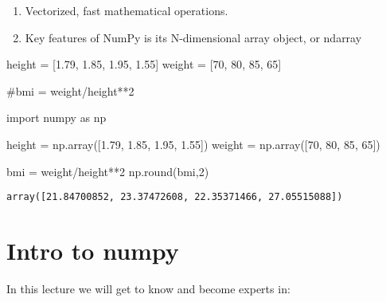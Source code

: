\documentclass[
  letterpaper,
  DIV=11,
  numbers=noendperiod]{scrreprt}
\newenvironment{Shaded}{\begin{snugshade}}{\end{snugshade}}
\newcommand{\BuiltInTok}[1]{\textcolor[rgb]{0.00,0.23,0.31}{#1}}
\newcommand{\CommentTok}[1]{\textcolor[rgb]{0.37,0.37,0.37}{#1}}
\newcommand{\DecValTok}[1]{\textcolor[rgb]{0.68,0.00,0.00}{#1}}
\newcommand{\FloatTok}[1]{\textcolor[rgb]{0.68,0.00,0.00}{#1}}
\newcommand{\ImportTok}[1]{\textcolor[rgb]{0.00,0.46,0.62}{#1}}
\newcommand{\NormalTok}[1]{\textcolor[rgb]{0.00,0.23,0.31}{#1}}
\newcommand{\OperatorTok}[1]{\textcolor[rgb]{0.37,0.37,0.37}{#1}}
\providecommand{\tightlist}{%
  \setlength{\itemsep}{0pt}\setlength{\parskip}{0pt}}\usepackage{longtable,booktabs,array}
\begin{document}
\begin{enumerate}
\def\labelenumi{\arabic{enumi}.}
\tightlist
\item
  Vectorized, fast mathematical operations.
\item
  Key features of NumPy is its N-dimensional array object, or ndarray
\end{enumerate}

\begin{Shaded}
\begin{Highlighting}[]
\NormalTok{height }\OperatorTok{=}\NormalTok{ [}\FloatTok{1.79}\NormalTok{, }\FloatTok{1.85}\NormalTok{, }\FloatTok{1.95}\NormalTok{, }\FloatTok{1.55}\NormalTok{]}
\NormalTok{weight }\OperatorTok{=}\NormalTok{ [}\DecValTok{70}\NormalTok{, }\DecValTok{80}\NormalTok{, }\DecValTok{85}\NormalTok{, }\DecValTok{65}\NormalTok{]}

\CommentTok{\#bmi = weight/height**2}
\end{Highlighting}
\end{Shaded}

\begin{Shaded}
\begin{Highlighting}[]
\ImportTok{import}\NormalTok{ numpy }\ImportTok{as}\NormalTok{ np}

\NormalTok{height }\OperatorTok{=}\NormalTok{ np.array([}\FloatTok{1.79}\NormalTok{, }\FloatTok{1.85}\NormalTok{, }\FloatTok{1.95}\NormalTok{, }\FloatTok{1.55}\NormalTok{])}
\NormalTok{weight }\OperatorTok{=}\NormalTok{ np.array([}\DecValTok{70}\NormalTok{, }\DecValTok{80}\NormalTok{, }\DecValTok{85}\NormalTok{, }\DecValTok{65}\NormalTok{])}

\NormalTok{bmi }\OperatorTok{=}\NormalTok{ weight}\OperatorTok{/}\NormalTok{height}\OperatorTok{**}\DecValTok{2}
\NormalTok{np.}\BuiltInTok{round}\NormalTok{(bmi,}\DecValTok{2}\NormalTok{)}
\end{Highlighting}
\end{Shaded}

\begin{verbatim}
array([21.84700852, 23.37472608, 22.35371466, 27.05515088])
\end{verbatim}


\hypertarget{intro-to-numpy}{%
\chapter{Intro to numpy}\label{intro-to-numpy}}

In this lecture we will get to know and become experts in:
\end{document}
